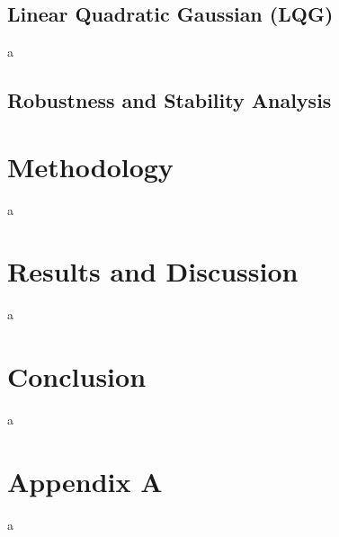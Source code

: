 \documentclass[a4paper,11pt]{book}
\numberwithin{figure}{chapter}
\numberwithin{equation}{chapter}
\numberwithin{table}{chapter}
\theoremstyle{definition}
\begin{document}
\section{Linear Quadratic Gaussian (LQG)}

a

\section{Robustness and Stability Analysis}


\clearpage
\chapter{Methodology}

a

\clearpage
\chapter{Results and Discussion}

a

\clearpage
\chapter{Conclusion}

a

\clearpage
{}




\clearpage
{}
\chapter*{Appendix A}

a
	
\end{document}
